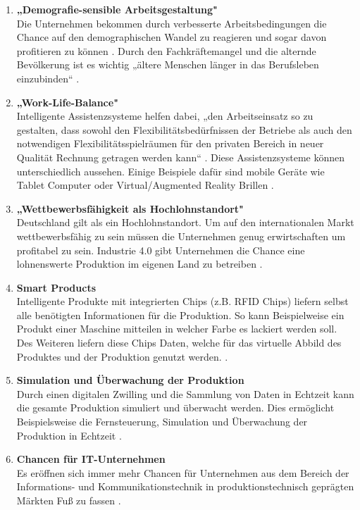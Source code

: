 \begin{enumerate}
	\item \textbf{„Demografie-sensible Arbeitsgestaltung"} \cite[S.20]{12} \\
	Die Unternehmen bekommen durch verbesserte Arbeitsbedingungen die Chance auf den 
	demographischen Wandel zu reagieren und sogar davon profitieren zu können \cite[S.20]{12}. Durch den Fachkräftemangel und die alternde Bevölkerung ist es wichtig 
	„ältere Menschen länger in das Berufsleben einzubinden“ \cite{6}.
	\item \textbf{„Work-Life-Balance"} \cite[S.20]{12} \\
	Intelligente Assistenzsysteme helfen dabei, „den Arbeitseinsatz so zu gestalten, dass sowohl
	den Flexibilitätsbedürfnissen der Betriebe als auch den notwendigen Flexibilitätsspielräumen
	für den privaten Bereich in neuer Qualität Rechnung getragen werden kann“ \cite[S.20]{12}. Diese Assistenzsysteme können unterschiedlich aussehen. Einige Beispiele dafür sind mobile Geräte wie Tablet Computer oder Virtual/Augmented Reality Brillen \cite{6}.
	\item \textbf{„Wettbewerbsfähigkeit als Hochlohnstandort"} \cite[S.20]{12} \\
	Deutschland gilt als ein Hochlohnstandort. Um auf den internationalen Markt 
	wettbewerbsfähig zu sein müssen die Unternehmen genug erwirtschaften um profitabel
	zu sein. Industrie 4.0 gibt Unternehmen die Chance eine lohnenswerte Produktion im eigenen Land zu betreiben \cite[S.20]{12}.
	\item \textbf{Smart Products} \cite{6} \\
	Intelligente Produkte mit integrierten Chips (z.B. RFID Chips) liefern selbst alle benötigten
	Informationen für die Produktion. So kann Beispielweise ein Produkt einer Maschine 
	mitteilen in welcher Farbe es lackiert werden soll. Des Weiteren liefern diese Chips Daten, 
	welche für das virtuelle Abbild des Produktes und der Produktion genutzt werden. \cite{6}.
	\item \textbf{Simulation und Überwachung der Produktion} \cite{6} \\
	Durch einen digitalen Zwilling und die Sammlung von Daten in Echtzeit kann die gesamte
	Produktion simuliert und überwacht werden. Dies ermöglicht Beispielsweise die
	Fernsteuerung, Simulation und Überwachung der Produktion in Echtzeit \cite{6}.
	\item \textbf{Chancen für IT-Unternehmen} \cite[S.7]{2} \\
	Es eröffnen sich immer mehr Chancen für Unternehmen aus dem Bereich der Informations- und Kommunikationstechnik in produktionstechnisch geprägten Märkten Fuß zu fassen \cite[S.7]{2}.
\end{enumerate}

